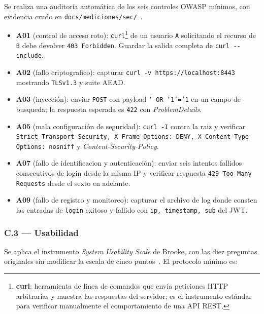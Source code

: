 \documentclass[11pt,a4paper]{article}
\begin{document}
Se realiza una auditor\'{i}a autom\'{a}tica de los seis controles OWASP m\'{i}nimos, con evidencia crudo en \texttt{docs/mediciones/sec/}~\cite{owasp2021top10}.

\begin{itemize}
    \item \textbf{A01} (control de acceso roto): \texttt{curl}\footnote{\textbf{curl}: herramienta de l\'{i}nea de comandos que env\'{i}a peticiones HTTP arbitrarias y muestra las respuestas del servidor; es el instrumento est\'{a}ndar para verificar manualmente el comportamiento de una API REST.} de un usuario \texttt{A} solicitando el recurso de \texttt{B} debe devolver \texttt{403 Forbidden}. Guardar la salida completa de \texttt{curl -{-}include}.
    \item \textbf{A02} (fallo criptografico): capturar \texttt{curl -v https://localhost:8443} mostrando \texttt{TLSv1.3} y suite AEAD.
    \item \textbf{A03} (inyecci\'{o}n): enviar \texttt{POST} con payload \texttt{' OR '1'='1} en un campo de busqueda; la respuesta esperada es \texttt{422} con \emph{ProblemDetails}.
    \item \textbf{A05} (mala configuraci\'{o}n de seguridad): \texttt{curl -I} contra la raiz y verificar \texttt{Strict-Transport-Security, X-Frame-Options: DENY, X-Content-Type-Options: nosniff} y \emph{Content-Security-Policy}.
    \item \textbf{A07} (fallo de identificacion y autenticaci\'{o}n): enviar seis intentos fallidos consecutivos de login desde la misma IP y verificar respuesta \texttt{429 Too Many Requests} desde el sexto en adelante.
    \item \textbf{A09} (fallo de registro y monitoreo): capturar el archivo de log donde consten las entradas de \texttt{login} exitoso y fallido con \texttt{ip, timestamp, sub} del JWT.
\end{itemize}

\subsubsection*{C.3 --- Usabilidad}

Se aplica el instrumento \emph{System Usability Scale} de Brooke, con las diez preguntas originales sin modificar la escala de cinco puntos~\cite{brooke1996sus}. El protocolo m\'{i}nimo es:
\end{document}
